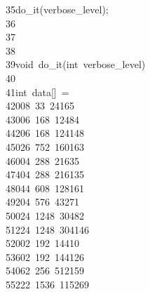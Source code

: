 \begin{tabbing}
35\>\>do\_it(verbose\_level);\\[0pt]
36\>\\[0pt]
37\>\\[0pt]
38\>\\[0pt]
39\>void\ do\_it(int\ verbose\_level)\\[0pt]
40\>\\[0pt]
41\>\>int\ data[]\ =\ \\[0pt]
42\>\>\>008\ 33\ 24165\\[0pt]
43\>\>\>006\ 168\ 12484\\[0pt]
44\>\>\>206\ 168\ 124148\\[0pt]
45\>\>\>026\ 752\ 160163\\[0pt]
46\>\>\>004\ 288\ 21635\\[0pt]
47\>\>\>404\ 288\ 216135\\[0pt]
48\>\>\>044\ 608\ 128161\\[0pt]
49\>\>\>204\ 576\ 43271\\[0pt]
50\>\>\>024\ 1248\ 30482\\[0pt]
51\>\>\>224\ 1248\ 304146\\[0pt]
52\>\>\>002\ 192\ 14410\\[0pt]
53\>\>\>602\ 192\ 144126\\[0pt]
54\>\>\>062\ 256\ 512159\\[0pt]
55\>\>\>222\ 1536\ 115269\\[0pt]

\end{tabbing}
